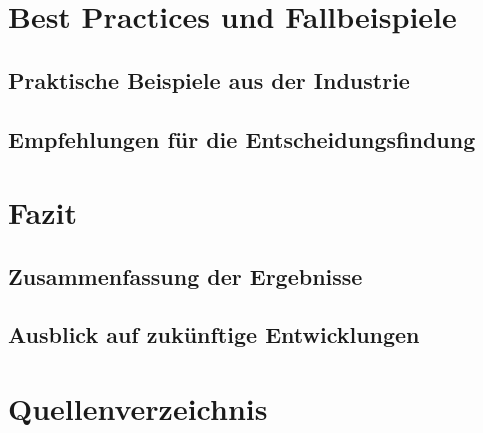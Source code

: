 \documentclass[12pt,bibtotoc]{article}
\newcounter{romanBeginningEnd} %
\begin{document}
	\section{Best Practices und Fallbeispiele}
		\subsection{Praktische Beispiele aus der Industrie}
		\subsection{Empfehlungen für die Entscheidungsfindung}

	\section{Fazit}
		\subsection{Zusammenfassung der Ergebnisse}
		\subsection{Ausblick auf zukünftige Entwicklungen}




	
	
	\newpage
	\setcounter{page}{\theromanBeginningEnd} %
	\setcounter{secnumdepth}{0} %
	\section{Quellenverzeichnis}
	\setcounter{secnumdepth}{3} %
	\printbibliography[heading=none]
	\newpage
	\appendix
	\clearpage
\end{document}
